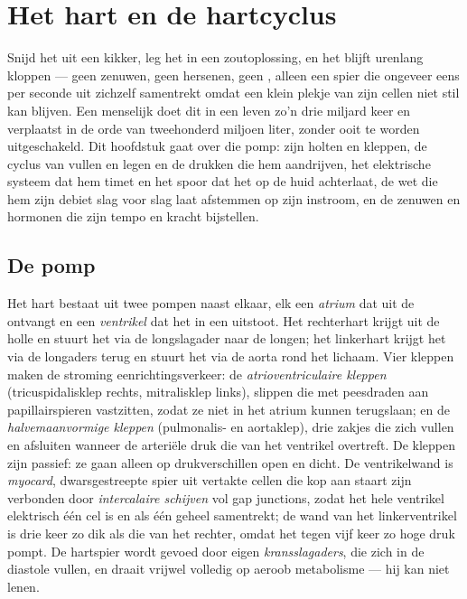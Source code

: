 \chapter{Het hart en de hartcyclus}\label{ch:b2:heart}

Snijd het  uit een kikker, leg het in een zoutoplossing, en het blijft
urenlang kloppen --- geen zenuwen, geen hersenen, geen , alleen een
spier die ongeveer eens per seconde uit zichzelf samentrekt omdat een
klein plekje van zijn cellen niet stil kan blijven. Een menselijk  doet
dit in een leven zo'n drie miljard keer en verplaatst in de orde van
tweehonderd miljoen liter, zonder ooit te worden uitgeschakeld. Dit
hoofdstuk gaat over die pomp: zijn holten en kleppen, de cyclus van vullen
en legen en de drukken die hem aandrijven, het elektrische systeem dat hem
timet en het spoor dat het op de huid achterlaat, de wet die hem zijn
debiet slag voor slag laat afstemmen op zijn instroom, en de zenuwen en
hormonen die zijn tempo en kracht bijstellen.

\section{De pomp}

\begin{definition}\label{def:b2:heart:anatomy}
Het hart bestaat uit twee pompen naast elkaar, elk een \emph{atrium} dat
 uit de  ontvangt en een \emph{ventrikel} dat het in een 
uitstoot. Het rechterhart krijgt  uit de holle  en stuurt het via
de longslagader naar de longen; het linkerhart krijgt het via de longaders
terug en stuurt het via de aorta rond het lichaam. Vier kleppen maken de
stroming eenrichtingsverkeer: de \emph{atrioventriculaire kleppen}
(tricuspidalisklep rechts, mitralisklep links), slippen die met peesdraden
aan papillairspieren vastzitten, zodat ze niet in het atrium kunnen
terugslaan; en de \emph{halvemaanvormige kleppen} (pulmonalis- en
aortaklep), drie zakjes die zich vullen en afsluiten wanneer de arteriële
druk die van het ventrikel overtreft. De kleppen zijn passief: ze gaan
alleen op drukverschillen open en dicht. De ventrikelwand is
\emph{myocard}, dwarsgestreepte spier uit vertakte cellen die kop aan staart
zijn verbonden door \emph{intercalaire schijven} vol gap junctions, zodat
het hele ventrikel elektrisch één cel is en als één geheel samentrekt; de
wand van het linkerventrikel is drie keer zo dik als die van het rechter,
omdat het tegen vijf keer zo hoge druk pompt. De hartspier wordt gevoed door
eigen \emph{kransslagaders}, die zich in de diastole vullen, en draait
vrijwel volledig op aeroob metabolisme --- hij kan niet lenen.
\end{definition}

